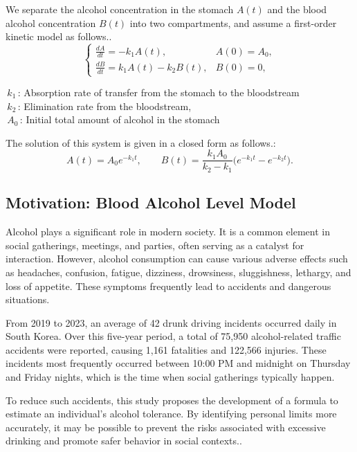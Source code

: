 \documentclass[11pt]{article}
\begin{document}
We separate the alcohol concentration in the stomach \(A(t)\) and the blood alcohol concentration \(B(t)\) into two compartments, and assume a first-order kinetic model as follows.\cite{base_kinetic_eq}.
\[
\begin{cases}
\displaystyle \frac{dA}{dt} = -k_1 A(t), 
& A(0) = A_0, \\[1em]
\displaystyle \frac{dB}{dt} = k_1 A(t) - k_2 B(t), 
& B(0) = 0,
\end{cases}
\]
  
\(\,k_1\)\,: Absorption rate of transfer from the stomach to the bloodstream\\  
\(\,k_2\)\,: Elimination rate from the bloodstream,  \\
\(\,A_0\)\,: Initial total amount of alcohol in the stomach

The solution of this system is given in a closed form as follows.\cite{base_kinetic_eq}:
\[
A(t) = A_0 e^{-k_1 t},
\qquad
B(t) = \frac{k_1 A_0}{k_2 - k_1}
\bigl(e^{-k_1 t} - e^{-k_2 t}\bigr).
\]



\subsection{Motivation: Blood Alcohol Level Model}
Alcohol plays a significant role in modern society. It is a common element in social gatherings, meetings, and parties, often serving as a catalyst for interaction. However, alcohol consumption can cause various adverse effects such as headaches, confusion, fatigue, dizziness, drowsiness, sluggishness, lethargy, and loss of appetite. These symptoms frequently lead to accidents and dangerous situations.

From 2019 to 2023, an average of 42 drunk driving incidents occurred daily in South Korea. Over this five-year period, a total of 75,950 alcohol-related traffic accidents were reported, causing 1,161 fatalities and 122,566 injuries. These incidents most frequently occurred between 10:00 PM and midnight on Thursday and Friday nights, which is the time when social gatherings typically happen.

To reduce such accidents, this study proposes the development of a formula to estimate an individual's alcohol tolerance. By identifying personal limits more accurately, it may be possible to prevent the risks associated with excessive drinking and promote safer behavior in social contexts.\cite{drink_drive}.
\end{document}
